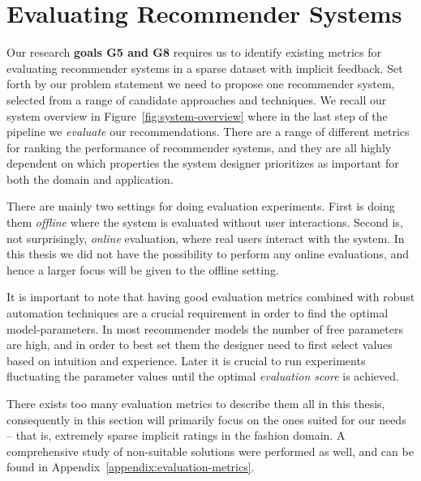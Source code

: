 \section{Evaluating Recommender Systems}
\label{sec:evaluation}

Our research \textbf{goals G5 and G8} requires us to identify existing metrics
for evaluating recommender systems in a sparse dataset with implicit feedback.
Set forth by our problem statement we need to propose one recommender system,
selected from a range of candidate approaches and techniques. We recall our
system overview in Figure~\ref{fig:system-overview} where in the last step of
the pipeline we \textit{evaluate} our recommendations. There are a range of
different metrics for ranking the performance of recommender systems, and they
are all highly dependent on which properties the system designer prioritizes as
important for both the domain and application.

There are mainly two settings for doing evaluation experiments. First is doing
them \textit{offline} where the system is evaluated without user interactions.
Second is, not surprisingly, \textit{online} evaluation, where real users
interact with the system. In this thesis we did not have the possibility to
perform any online evaluations, and hence a larger focus will be given to the
offline setting.

It is important to note that having good evaluation metrics combined with
robust automation techniques are a crucial requirement in order to find the
optimal model-parameters. In most recommender models the number of free
parameters are high, and in order to best set them the designer need to first
select values based on intuition and experience. Later it is crucial to run
experiments fluctuating the parameter values until the optimal
\textit{evaluation score} is achieved.

There exists too many evaluation metrics to describe them all in this thesis,
consequently in this section will primarily focus on the ones suited for our
needs -- that is, extremely sparse implicit ratings in the fashion domain. A
comprehensive study of non-suitable solutions were performed as well, and can
be found in Appendix~\ref{appendix:evaluation-metrics}.

